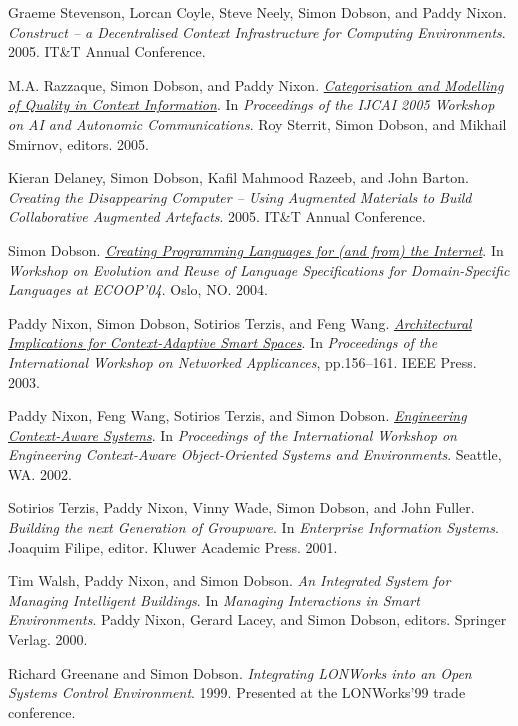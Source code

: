 \documentclass[11pt]{article}
\begin{document}
\label{org9fc91a4}Graeme Stevenson, Lorcan Coyle, Steve Neely, Simon Dobson, and Paddy Nixon.  \emph{Construct – a Decentralised Context Infrastructure for Computing Environments}. 2005. IT\&T Annual Conference.

\label{org442d3ca}M.A. Razzaque, Simon Dobson, and Paddy Nixon.  \emph{\href{https://simondobson.org/softcopy/ijcai-aiac-05a.pdf}{Categorisation and Modelling of Quality in Context Information}}. In \emph{Proceedings of the IJCAI 2005 Workshop on AI and Autonomic Communications}. Roy Sterrit, Simon Dobson, and Mikhail Smirnov, editors. 2005.

\label{orgc9c2ad3}Kieran Delaney, Simon Dobson, Kafil Mahmood Razeeb, and John Barton.  \emph{Creating the Disappearing Computer – Using Augmented Materials to Build Collaborative Augmented Artefacts}. 2005. IT\&T Annual Conference.

\label{orgb18f38f}Simon Dobson.  \emph{\href{https://simondobson.org/softcopy/ERLS-04.pdf}{Creating Programming Languages for (and from) the Internet}}. In \emph{Workshop on Evolution and Reuse of Language Specifications for Domain-Specific Languages at ECOOP’04}. Oslo, NO. 2004.

\label{orgd8f18f6}Paddy Nixon, Simon Dobson, Sotirios Terzis, and Feng Wang.  \emph{\href{https://simondobson.org/softcopy/IWNA-2003.pdf}{Architectural Implications for Context-Adaptive Smart Spaces}}. In \emph{Proceedings of the International Workshop on Networked Applicances}, pp.156–161. IEEE Press. 2003.

\label{org9f0fa12}Paddy Nixon, Feng Wang, Sotirios Terzis, and Simon Dobson.  \emph{\href{https://simondobson.org/softcopy/ecoose-2003.pdf}{Engineering Context-Aware Systems}}. In \emph{Proceedings of the International Workshop on Engineering Context-Aware Object-Oriented Systems and Environments}. Seattle, WA. 2002.

\label{orge8437a4}Sotirios Terzis, Paddy Nixon, Vinny Wade, Simon Dobson, and John Fuller.  \emph{Building the next Generation of Groupware}. In \emph{Enterprise Information Systems}. Joaquim Filipe, editor. Kluwer Academic Press. 2001.

\label{orga38f57d}Tim Walsh, Paddy Nixon, and Simon Dobson.  \emph{An Integrated System for Managing Intelligent Buildings}. In \emph{Managing Interactions in Smart Environments}. Paddy Nixon, Gerard Lacey, and Simon Dobson, editors. Springer Verlag. 2000.

\label{orgafc6329}Richard Greenane and Simon Dobson.  \emph{Integrating LONWorks into an Open Systems Control Environment}. 1999. Presented at the LONWorks’99 trade conference.
\end{document}
